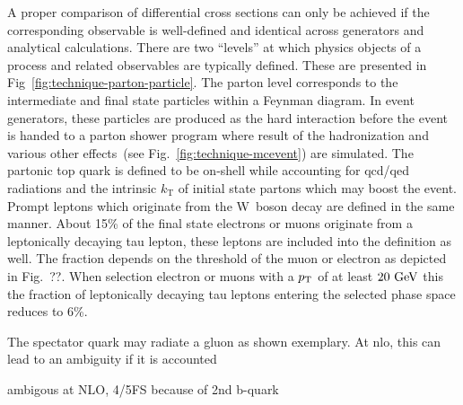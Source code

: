 A proper comparison of differential cross sections can only be achieved if the corresponding observable is well-defined and identical across generators and analytical calculations. There are two ``levels'' at which physics objects of a process and related observables are typically defined. These are presented in Fig~\ref{fig:technique-parton-particle}. The parton level corresponds to the intermediate and final state particles within a Feynman diagram. In event generators, these particles are produced as the hard interaction before the event is handed to a parton shower program where result of the hadronization and various other effects~(see Fig.~\ref{fig:technique-mcevent}) are simulated. The partonic top quark is defined to be on-shell while accounting for \gls{qcd}/\gls{qed} radiations and the intrinsic $k_\mathrm{T}$ of initial state partons which may boost the event. Prompt leptons which originate from the W~boson decay are defined in the same manner. About 15\% of the final state electrons or muons originate from a leptonically decaying tau lepton, these leptons are included into the definition as well. The fraction depends on the \pt threshold of the muon or electron as depicted in Fig.~??. When selection electron or muons with a $p_\mathrm{T}$ of at least $20~\mathrm{GeV}$ this the fraction of leptonically decaying tau leptons entering the selected phase space reduces to 6\%.


The spectator quark may radiate a gluon as shown exemplary. At \gls{nlo}, this can lead to an ambiguity if it is accounted

ambigous at NLO, 4/5FS because of 2nd b-quark


